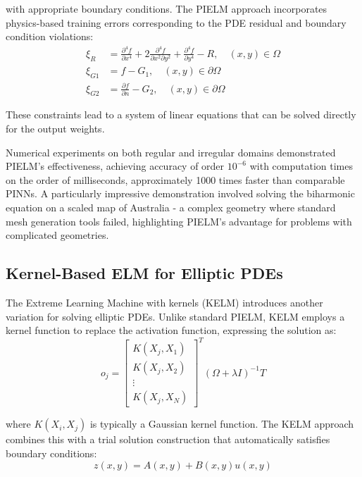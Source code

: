 \documentclass[11pt]{article}
\begin{document}
with appropriate boundary conditions. The PIELM approach incorporates physics-based training errors corresponding to the PDE residual and boundary condition violations:
\begin{align}
\xi_R &= \frac{\partial^4 f}{\partial x^4} + 2\frac{\partial^4 f}{\partial x^2 \partial y^2} + \frac{\partial^4 f}{\partial y^4} - R, \quad (x,y) \in \Omega\\
\xi_{G1} &= f - G_1, \quad (x,y) \in \partial\Omega\\
\xi_{G2} &= \frac{\partial f}{\partial n} - G_2, \quad (x,y) \in \partial\Omega
\end{align}

These constraints lead to a system of linear equations that can be solved directly for the output weights.

Numerical experiments on both regular and irregular domains demonstrated PIELM's effectiveness, achieving accuracy of order $10^{-6}$ with computation times on the order of milliseconds, approximately 1000 times faster than comparable PINNs. A particularly impressive demonstration involved solving the biharmonic equation on a scaled map of Australia - a complex geometry where standard mesh generation tools failed, highlighting PIELM's advantage for problems with complicated geometries.

\subsection{Kernel-Based ELM for Elliptic PDEs}

The Extreme Learning Machine with kernels (KELM) \citep{Li2023} introduces another variation for solving elliptic PDEs. Unlike standard PIELM, KELM employs a kernel function to replace the activation function, expressing the solution as:
\begin{equation}
o_j = \begin{bmatrix} K(X_j, X_1) \\ K(X_j, X_2) \\ \vdots \\ K(X_j, X_N) \end{bmatrix}^T (\Omega + \lambda I)^{-1}T
\end{equation}

where $K(X_i, X_j)$ is typically a Gaussian kernel function. The KELM approach combines this with a trial solution construction that automatically satisfies boundary conditions:
\begin{equation}
z(x, y) = A(x, y) + B(x, y)u(x, y)
\end{equation}
\end{document}
